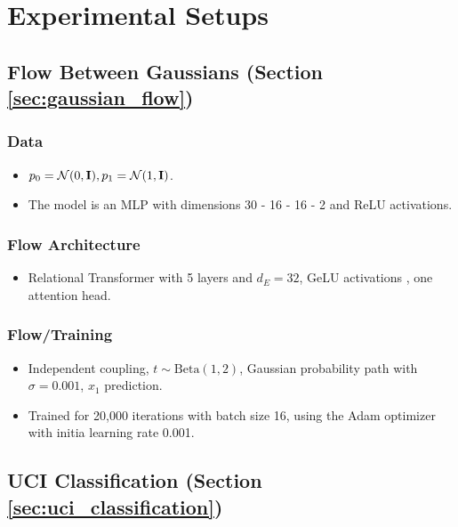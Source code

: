 
\chapter{Experimental Setups}\label{appendix:experimental_setups}

\section*{Flow Between Gaussians (Section \ref{sec:gaussian_flow})}

\subsection*{Data}

\begin{itemize}
    \item $p_0 = \mathcal{N}(0, \mathbf{I}), p_1 = \mathcal{N}(1, \mathbf{I})$. 
    \item The model is an MLP with dimensions 30 - 16 - 16 - 2 and ReLU activations. 
\end{itemize}

\subsection*{Flow Architecture}
\begin{itemize}
    \item Relational Transformer \citep{diaoRelationalAttentionGeneralizing2023,kofinasGraphNeuralNetworks2024} with 5 layers and $d_E = 32$, GeLU activations \citep{hendrycksGaussianErrorLinear2023a}, one attention head. 
\end{itemize}

\subsection*{Flow/Training}
\begin{itemize}
    \item Independent coupling, $t \sim \text{Beta}(1, 2)$, Gaussian probability path with $\sigma = 0.001$, $x_1$ prediction.
    \item Trained for 20,000 iterations with batch size 16, using the Adam optimizer with initia learning rate 0.001.
\end{itemize}

\section*{UCI Classification (Section \ref{sec:uci_classification})}

